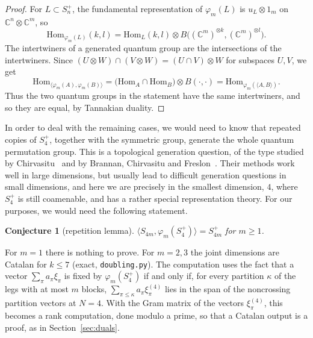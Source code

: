 \documentclass[11pt]{amsart}
\newtheorem{conjecture}[theorem]{Conjecture}
\theoremstyle{definition}
\theoremstyle{remark}
\theoremstyle{plain}
\numberwithin{equation}{section}
\numberwithin{table}{section}
\newcommand{\C}{\mathbb C}
\begin{document}
\begin{proof}
For $L\subset S_n^+$, the fundamental representation of $\varphi_m(L)$ is $u_L\otimes1_m$ on $\C^n\otimes\C^m$, so
\[
\mathrm{Hom}_{\varphi_m(L)}(k,l)=\mathrm{Hom}_L(k,l)\otimes B\big((\C^m)^{\otimes k},(\C^m)^{\otimes l}\big).
\]
The intertwiners of a generated quantum group are the intersections of the intertwiners. Since $(U\otimes W)\cap(V\otimes W)=(U\cap V)\otimes W$ for subspaces $U,V$, we get
\[
\mathrm{Hom}_{\langle\varphi_m(A),\varphi_m(B)\rangle}=\big(\mathrm{Hom}_A\cap\mathrm{Hom}_B\big)\otimes B(\cdot,\cdot)=\mathrm{Hom}_{\varphi_m(\langle A,B\rangle)} .
\]
Thus the two quantum groups in the statement have the same intertwiners, and so they are equal, by Tannakian duality.
\end{proof}

In order to deal with the remaining cases, we would need to know that repeated copies of $S_4^+$, together with the symmetric group, generate the whole quantum permutation group. This is a topological generation question, of the type studied by Chirvasitu~\cite{ch2} and by Brannan, Chirvasitu and Freslon~\cite{bcf}. Their methods work well in large dimensions, but usually lead to difficult generation questions in small dimensions, and here we are precisely in the smallest dimension, $4$, where $S_4^+$ is still coamenable, and has a rather special representation theory. For our purposes, we would need the following statement.

\begin{conjecture}[repetition lemma]\label{conj:rep}
$\langle S_{4m},\varphi_m(S_4^+)\rangle=S_{4m}^+$ for $m\ge1$.
\end{conjecture}

For $m=1$ there is nothing to prove. For $m=2,3$ the joint dimensions are Catalan for $k\le7$ (exact, \texttt{doubling.py}). The computation uses the fact that a vector $\sum_\pi a_\pi\xi_\pi$ is fixed by $\varphi_m(S_4^+)$ if and only if, for every partition $\kappa$ of the legs with at most $m$ blocks, $\sum_{\pi\le\kappa}a_\pi\xi_\pi^{(4)}$ lies in the span of the noncrossing partition vectors at $N=4$. With the Gram matrix of the vectors $\xi_\pi^{(4)}$, this becomes a rank computation, done modulo a prime, so that a Catalan output is a proof, as in Section~\ref{sec:duals}.
\end{document}
